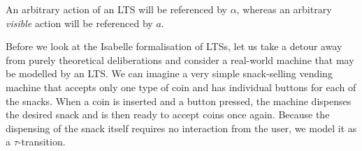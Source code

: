 \begin{isabellebody}
\begin{isamarkuptext}
An arbitrary action of an LTS will be referenced by $\alpha$, whereas an arbitrary \emph{visible} action will be referenced by $a$.%
\end{isamarkuptext}\isamarkuptrue%
%
\isadelimdocument
%
\endisadelimdocument
%
\isatagdocument
%
\isamarkuptrue%
%
\endisatagdocument
{\isafolddocument}%
%
\isadelimdocument
%
\endisadelimdocument
%
\begin{isamarkuptext}%
Before we look at the Isabelle formalisation of LTSs, let us take a detour away from purely theoretical deliberations and consider a real-world machine that may be modelled by an LTS. We can imagine a very simple snack-selling vending machine that accepts only one type of coin and has individual buttons for each of the snacks. When a coin is inserted and a button pressed, the machine dispenses the desired snack and is then ready to accept coins once again. Because the dispensing of the snack itself requires no interaction from the user, we model it as a $\tau$-transition.

\end{isamarkuptext}
\end{isabellebody}
